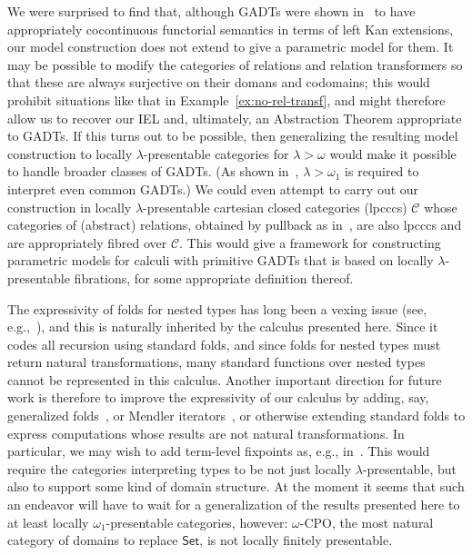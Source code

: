 \documentclass{lmcs}
\theoremstyle{plain}\newtheorem{satz}[thm]{Satz}
\newcommand{\cal}{\mathcal}
\newcommand{\set}{\mathsf{Set}}
\begin{document}
We were surprised to find that, although GADTs were shown
in~\cite{jp19} to have appropriately cocontinuous functorial semantics
in terms of left Kan extensions, our model construction does not
extend to give a parametric model for them. It may be possible to
modify the categories of relations and relation transformers so that
these are always surjective on their domans and codomains; this would
prohibit situations like that in Example~\ref{ex:no-rel-transf}, and
might therefore allow us to recover our IEL and, ultimately, an
Abstraction Theorem appropriate to GADTs.  If this turns out to be
possible, then generalizing the resulting model construction to
locally $\lambda$-presentable categories for $\lambda > \omega$ would
make it possible to handle broader classes of GADTs. (As shown
in~\cite{jp19}, $\lambda > \omega_1$ is required to interpret even
common GADTs.) We could even attempt to carry out our construction in
locally $\lambda$-presentable cartesian closed categories (lpcccs)
$\cal C$ whose categories of (abstract) relations, obtained by
pullback as in~\cite{jac99}, are also lpcccs and are appropriately
fibred over $\cal C$. This would give a framework for constructing
parametric models for calculi with primitive GADTs that is based on
locally $\lambda$-presentable fibrations, for some appropriate
definition thereof.

The expressivity of folds for nested types has long been a vexing
issue (see, e.g.,~\cite{bm98}), and this is naturally inherited by the
calculus presented here. Since it codes all recursion using standard
folds, and since folds for nested types must return natural
transformations, many standard functions over nested types cannot be
represented in this calculus. Another important direction for future
work is therefore to improve the expressivity of our calculus by
adding, say, generalized folds~\cite{bp99}, or Mendler
iterators~\cite{amu05}, or otherwise extending standard folds to
express computations whose results are not natural transformations. In
particular, we may wish to add term-level fixpoints as, e.g.,
in~\cite{pit00}. This would require the categories interpreting types
to be not just locally $\lambda$-presentable, but also to support some
kind of domain structure. At the moment it seems that such an endeavor
will have to wait for a generalization of the results presented here
to at least locally $\omega_1$-presentable categories, however:
$\omega$-CPO, the most natural category of domains to replace $\set$,
is not locally finitely presentable.




  
\end{document}
